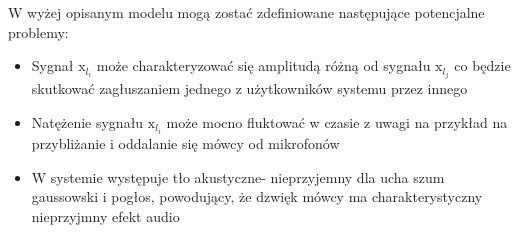 W wyżej opisanym modelu mogą zostać zdefiniowane następujące potencjalne problemy:
\begin{itemize}
    \item Sygnał $\bm{\mathrm{x}}_{l_{i}}$ może charakteryzować się amplitudą różną od sygnału $\bm{\mathrm{x}}_{l_{j}}$ co będzie skutkować zagłuszaniem jednego z użytkowników systemu przez innego 
    \item Natężenie sygnału $\bm{\mathrm{x}}_{l_{i}}$ może mocno fluktować w czasie z uwagi na przykład na przybliżanie i oddalanie się mówcy od mikrofonów
    \item W systemie występuje tło akustyczne- nieprzyjemny dla ucha szum gaussowski i pogłos, powodujący, że dzwięk mówcy ma charakterystyczny nieprzyjmny efekt audio
\end{itemize}
